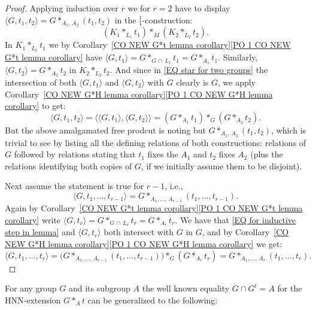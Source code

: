 \documentclass[12pt, a4paper]{amsart}
\newcommand{\1}{\{1\}}
\newcommand{\bigast}{\textrm{\footnotesize\ding{91}}}
\theoremstyle{plain}
\theoremstyle{definition}
\theoremstyle{remark}
\numberwithin{equation}{section}
\begin{document}
\begin{proof} 
Applying induction over $r$ we for $r=2$ have to display $\langle G, t_1,t_2 \rangle= 
G *_{A_1,\,A_2 } (t_1,t_2)$
in the $\bigast$-construction:
\begin{equation}
\label{EQ star for two groups}
(K_1 *_{L_1} t_1) *_M (K_2 *_{L_2} t_2).
\end{equation}
In $K_1 *_{L_1} t_1$ we by
Corollary~\ref{CO NEW G*t lemma corollary}\;\eqref{PO 1 CO NEW G*t lemma corollary} have
$\langle G, t_1 \rangle
= G *_{G \,\cap\, L_1} t_1
= G *_{A_1} t_1$. 
Similarly, $\langle G, t_2 \rangle= G *_{A_2} t_2$ in $K_2 *_{L_2} t_2$.
%
And  since in \eqref{EQ star for two groups} the intersection of both $\langle G, t_1 \rangle$ and $\langle G, t_2  \rangle$ with $G$ clearly is $G$, we apply  Corollary~\ref{CO NEW G*H lemma corollary}\;\eqref{PO 1 CO NEW G*H lemma corollary}
to get: 
$$
\langle G, t_1 , t_2 \rangle= 
\big\langle\langle G, t_1\rangle, \langle G, t_2\rangle\big\rangle= 
(G *_{A_1} t_1) *_G (G *_{A_2} t_2).
$$
But the above amalgamated free prodcut is noting but $G *_{A_1,\,A_2 } (t_1,t_2)$, which is trivial to see by listing all the defining relations of both constructions: relations of $G$ followed by relations stating that $t_1$ fixes the  $A_1$ and $t_2$ fixes  $A_2$ (plus the relations identifying both copies of $G$, if we initially assume them to be disjoint).

Next assume the statement is true for $r\!-\!1$, i.e.,
\begin{equation}
\label{EQ for inductive step in lemma}
\langle G, t_1,\ldots,t_{r-1} \rangle= 
G *_{A_1,\ldots,\,A_{r-1} } (t_1,\ldots,t_{r-1} ).
\end{equation}
Again by Corollary~\ref{CO NEW G*t lemma corollary}\;\eqref{PO 1 CO NEW G*t lemma corollary} write
$\langle G, t_r \rangle
= G *_{G \,\cap\, L_r}\!  t_r
= G *_{A_r}\! t_r$.
%
We have that \eqref{EQ for inductive step in lemma} and $\langle G, t_r \rangle$ both intersect with $G$ in $G$, and by Corollary~\ref{CO NEW G*H lemma corollary}\;\eqref{PO 1 CO NEW G*H lemma corollary}
we get:
\begin{equation*}
\label{EQ rewritten long form  multi-dimensional}
\langle G, t_1,\ldots,t_r \rangle=
\big(
G *_{A_1,\ldots,\,A_{r-1}}  (t_1,\ldots,t_{r-1} )\big) *_G  (G *_{A_r} t_r)
=
G *_{A_1,\ldots,\,A_{r} } (t_1,\ldots,t_{r} ).
\end{equation*}
\end{proof}



For any group $G$ and its subgroup $A$ 
the well known equality $G \cap G^t \!= A$ for the HNN-extension $G*_A t$  can be generalized to the following:
\end{document}
